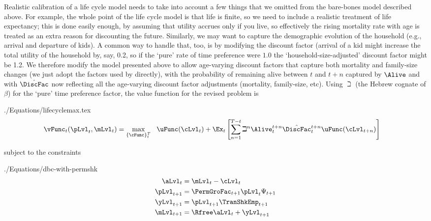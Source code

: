 \documentclass[titlepage, headings=optiontotocandhead]{\econtex}
\begin{document}
Realistic calibration of a life cycle model needs to take into account a few things that we omitted from the bare-bones model described above. For example, the whole point of the life cycle model is that life is finite, so we need to include a realistic treatment of life expectancy; this is done easily enough, by assuming that utility accrues only if you live, so effectively the rising mortality rate with age is treated as an extra reason for discounting the future.  Similarly, we may want to capture the demographic evolution of the household (e.g., arrival and departure of kids).  A common way to handle that, too, is by modifying the discount factor (arrival of a kid might increase the total utility of the household by, say, 0.2, so if the `pure' rate of time preference were $1.0$ the `household-size-adjusted' discount factor might be 1.2.  We therefore modify the model presented above to allow age-varying discount factors that capture both mortality and family-size changes (we just adopt the factors used by \cite{cagettiWprofiles} directly), with the probability of remaining alive between $t$ and $t+n$ captured by $\Alive$ and with $\hat{\DiscFac}$ now reflecting all the age-varying discount factor adjustments (mortality, family-size, etc).  Using $\beth$ (the Hebrew cognate of $\beta$) for the `pure' time preference factor, the value function for the revised problem is
\begin{verbatimwrite}{./Equations/lifecyclemax.tex}
  \begin{equation}\begin{gathered}\begin{aligned}
\vFunc_{t}(\pLvl_{t},\mLvl_{t}) & =    \max_{\{\cFunc\}_{t}^{T}}~~ \uFunc(\cLvl_{t})+\Ex_{t}\left[\sum_{n=1}^{T-t} {\beth}^{n} \Alive_{t}^{t+n}\hat{\DiscFac}_{t}^{t+n} \uFunc(\cLvl_{t+n}) \right]   \label{eq:lifecyclemax}
\end{aligned}\end{gathered}  \end{equation}
\end{verbatimwrite}
\unskip
subject to the constraints
\begin{verbatimwrite}{./Equations/dbc-with-permshk}
\begin{equation*}\begin{gathered}\begin{aligned}
      \aLvl_{t}  & = \mLvl_{t}-\cLvl_{t}
      \\      \pLvl_{t+1}  & = \PermGroFac_{t+1}\pLvl_{t}\Psi_{t+1}
      \\      \yLvl_{t+1}  & = \pLvl_{t+1}\TranShkEmp _{t+1}
      \\      \mLvl_{t+1}  & = \Rfree \aLvl_{t}+\yLvl_{t+1}
    \end{aligned}\end{gathered}\end{equation*}
\end{verbatimwrite}
\end{document}
